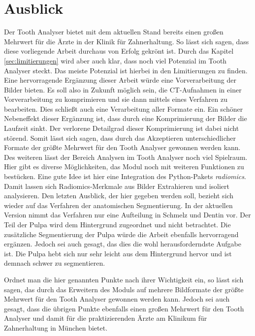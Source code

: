 \chapter{Ausblick}
\label{chap:schlussfolgerung} Der Tooth Analyser bietet mit dem aktuellen Stand bereits
einen großen Mehrwert für die Ärzte in der Klinik für Zahnerhaltung. So lässt
sich sagen, dass diese vorliegende Arbeit durchaus von Erfolg gekrönt ist. Durch
das Kapitel \ref{sec:limitierungen} wird aber auch klar, dass noch viel Potenzial
im Tooth Analyser steckt. Das meiste Potenzial ist hierbei in den Limitierungen
zu finden. Eine hervorragende Ergänzung dieser Arbeit würde eine Vorverarbeitung
der Bilder bieten. Es soll also in Zukunft möglich sein, die \ac{CT}-Aufnahmen
in einer Vorverarbeitung zu komprimieren und sie dann mittels eines Verfahren zu
bearbeiten. Dies schließt auch eine Verarbeitung aller Formate ein. Ein schöner
Nebeneffekt dieser Ergänzung ist, dass durch eine Komprimierung der Bilder die Laufzeit
sinkt. Der verlorene Detailgrad dieser Komprimierung ist dabei nicht störend. Somit
lässt sich sagen, dass durch das Akzeptieren unterschiedlicher Formate der
größte Mehrwert für den Tooth Analyser gewonnen werden kann. Des weiteren lässt der
Bereich Analysen im Tooth Analyser noch viel Spielraum. Hier gibt es diverse
Möglichkeiten, das Modul noch mit weiteren Funktionen zu bestücken. Eine gute
Idee ist hier eine Integration des Python-Pakets \textit{radiomics}. Damit
lassen sich Radiomics-Merkmale aus Bilder Extrahieren und isoliert analysieren. Den
letzten Ausblick, der hier gegeben werden soll, bezieht sich wieder auf das Verfahren
der anatomischen Segmentierung. In der aktuellen Version nimmt das Verfahren nur
eine Aufteilung in Schmelz und Dentin vor. Der Teil der Pulpa wird dem Hintergrund
zugeordnet und nicht betrachtet. Die zusätzliche Segmentierung der Pulpa würde
die Arbeit ebenfalls hervorragend ergänzen. Jedoch sei auch gesagt, das dies die
wohl herausforderndste Aufgabe ist. Die Pulpa hebt sich nur sehr leicht aus dem Hintergrund
hervor und ist demnach schwer zu segmentieren.

Ordnet man die hier genannten Punkte nach ihrer Wichtigkeit ein, so lässt sich
sagen, das durch das Erweitern des Moduls auf mehrere Bildformate der größte Mehrwert
für den Tooth Analyser gewonnen werden kann. Jedoch sei auch gesagt, dass die übrigen
Punkte ebenfalls einen großen Mehrwert für den Tooth Analyser und damit für die praktizierenden
Ärzte am Klinikum für Zahnerhaltung in München bietet.
